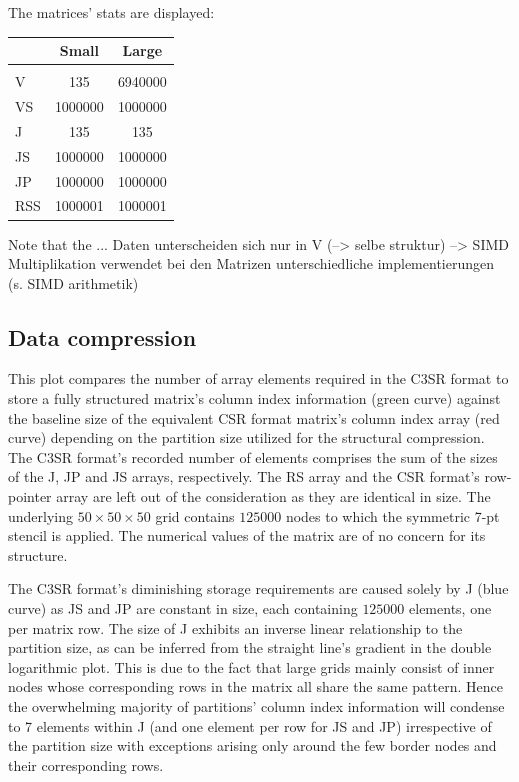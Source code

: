 \documentclass{article}
\begin{document}
    The matrices' stats are displayed:

    \begin{tabular}{ l c c }
             & Small & Large \\
      \hline                        \\
      V      & 135    & 6940000 \\
      VS     & 1000000 & 1000000 \\
      J      & 135    & 135 \\
      JS     & 1000000 & 1000000 \\
      JP     & 1000000 & 1000000 \\
      RSS    & 1000001 & 1000001 \\
    \end{tabular}

    Note that the ... Daten unterscheiden sich nur in V (--> selbe struktur)
    --> SIMD Multiplikation verwendet bei den Matrizen unterschiedliche implementierungen (s. SIMD arithmetik)
  \subsection{Data compression}

    This plot compares the number of array elements required in the C3SR format to store a fully structured matrix's column index information (green curve) against the baseline size of the equivalent CSR format matrix's column index array (red curve) depending on the partition size utilized for the structural compression. The C3SR format's recorded number of elements comprises the sum of the sizes of the J, JP and JS arrays, respectively. The RS array and the CSR format's row-pointer array are left out of the consideration as they are identical in size. The underlying $50 \times 50 \times 50$ grid contains $125000$ nodes to which the symmetric 7-pt stencil is applied. The numerical values of the matrix are of no concern for its structure.

    The C3SR format's diminishing storage requirements are caused solely by J (blue curve) as JS and
    JP are constant in size, each containing $125000$ elements, one per matrix row. The size of J
    exhibits an inverse linear relationship to the partition size, as can be inferred from the
    straight line's gradient in the double logarithmic plot. This is due to the fact that large
    grids mainly consist of inner nodes whose corresponding rows in the matrix all share the same pattern. Hence the overwhelming majority of partitions' column index information will condense to 7 elements within J (and one element per row for JS and JP) irrespective of the partition size with exceptions arising only around the few border nodes and their corresponding rows.
\end{document}
